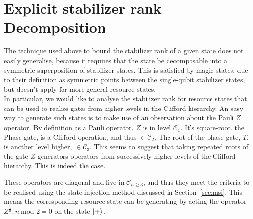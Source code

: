 \documentclass{standalone}
\begin{document}
\section{Explicit stabilizer rank Decomposition}\label{sec:decompositions}
The technique used above to bound the stabilizer rank of a given state does not easily generalise, because it requires that the state be decomposable into a symmetric superposition of stabilizer states. This is satisfied by magic states, due to their definition as symmetric points between the single-qubit stabilizer states, but doesn't apply for more general resource states. \\
In particular, we would like to analyse the stabilizer rank for resource states that can be used to realise gates from higher levels in the Clifford hierarchy. An easy way to generate such states is to make use of an observation about the Pauli $Z$ operator. By definition as a Pauli operator, $Z$ is in level $\mathcal{C}_{1}$. It's square-root, the Phase gate, is a Clifford operation, and thus $\in\mathcal{C}_{2}$. The root of the phase gate, $T$, is another level higher, $\in\mathcal{C}_{3}$. This seems to suggest that taking repeated roots of the gate $Z$ generators operators from successively higher levels of the Clifford hierarchy. This is indeed the case.
\par
These operators are diagonal and live in $\mathcal{C}_{n\geq3}$, and thus they meet the criteria to be realised using the state injection method discussed in Section~\ref{sec:msi}. This means the corresponding resource state can be generating by acting the operator $Z^{\frac{1}{n}}:n\;\text{mod } 2=0$ on the state $\ket{+}$. \\
\end{document}
